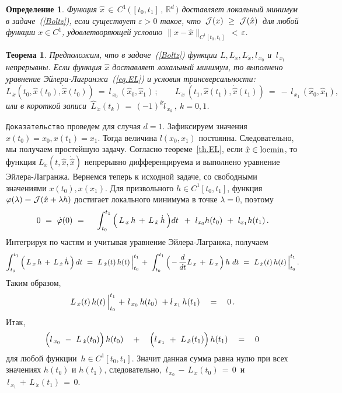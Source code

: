 \documentclass[12pt,a4paper]{article}
\newtheorem{theorem}{Теорема}
\newtheorem{defi}{Определение}
\newcommand{\re}{{\mathbb R}}
\newcommand{\cJ}{{\cal{J}}}
\begin{document}
\begin{defi}\label{d.feasible-boltz}
Функция $\hat x \, \in \, C^1\, \bigl( \, [t_0, t_1]\, , \, \re^d
\, \bigr)$ доставляет локальный минимум в
задаче~(\ref{Boltz}), если существует $\varepsilon
> 0$ такое, что $\, \cJ (x)\ \ge \ \cJ(\hat x)\, $ для любой
 функции $x \in C^1$, удовлетворяющей условию $\bigl\| x- \hat x
\bigr\|_{C^1[t_0, t_1]}\, < \, \varepsilon$.
\end{defi}
\begin{theorem}\label{th.Boltz}
Предположим, что в задаче~(\ref{Boltz}) функции $L, L_x, L_{\dot
x}, l_{\, x_0}$ и $\, l_{\, x_1}\, $ непрерывны.  Если функция
$\hat x$ доставляет локальный минимум, то выполнено
уравнение Эйлера-Лагранжа~(\ref{eq.EL}) и условия
трансверсальности:
\begin{equation}\label{eq.trans}
 L_{\, \dot x}(t_0, \hat x (t_0), \dot {\hat x}(t_0)) \ = \  l_{\, x_0}\, (\hat x_0, \hat x_1)\, ;
\qquad  L_{\, \dot x}\, (t_1, \hat x (t_1), \dot {\hat x}(t_1)) \
= \ -\, l_{\, x_1}\, (\hat x_0, \hat x_1),
\end{equation}
или в короткой записи $\, \hat L_{\, \dot x}(t_k)\, = \, (-1)^k
\hat l_{\, x_k}\, , \ k = 0,1$.
\end{theorem}
{\tt Доказательство} проведем для случая $d=1$.
Зафиксируем значения $x(t_0) = x_0, x(t_1) = x_1$. Тогда
величина $l(x_0, x_1)$ постоянна. Следовательно, мы получаем простейшую задачу.
Согласно теореме~\ref{th.EL}, если $\hat x \in {\rm locmin}$, то
функция $L_{\dot x}(t, \hat x, \dot {\hat x})$ непрерывно дифференцируема и
выполнено уравнение Эйлера-Лагранжа. Вернемся теперь к исходной задаче,
со свободными значениями $x(t_0), x(x_1)$. Для призвольного $h \in C^1[t_0, t_1]$, функция
$\varphi(\lambda) = \cJ(\hat x +
 \lambda h)$ достигает локального минимума в точке $\lambda = 0$, поэтому
 $$
0 \ = \ \dot \varphi(0)\ = \ \quad \int_{t_0}^{t_1}\, \Bigl(\, L_{\, x} \, h \, + \, L_{\, \dot
x}\, \dot h\, \Bigr)d t\, \ + \ l_{x_0}h(t_0) \ + \ l_{x_1}h(t_1)\, .
 $$
 Интегрируя по частям и учитывая уравнение Эйлера-Лагранжа,
получаем
$$
\int_{t_0}^{t_1}\, \Bigl(\, L_{\, x} \, h \, + \,
 L_{\, \dot x}\, \dot h\, \Bigr)\, d t\ =  \
  L_{\, \dot x}(t)\,  h(t)\, \Bigl|_{t_0}^{t_1} \ + \ \int_{t_0}^{t_1}\, \Bigl(\, - \, \frac{d}{dt} L_{\, x}  \, + \,
 L_{\, x}\, \Bigr)\, h\,\, d t \ = \ L_{\, \dot x}(t)\,  h(t)\, \Bigl|_{t_0}^{t_1}\, .
$$
 Таким образом, 
$$
 L_{\, \dot x}(t)\,  h(t)\, \Bigl|_{t_0}^{t_1}  \ + \
l_{\, x_0}\, h(t_0)\ +  l_{\, x_1}\, h(t_1) \quad = \quad 0\, .
$$
Итак,
$$
\Bigl(  l_{\, x_0} \ - \  L_{\, \dot x}(t_0)\Bigr)\,
h(t_0) \quad + \quad \Bigl( l_{\, x_1} \ + \  L_{\, \dot
x}(t_1)\Bigr)\, h(t_1)\quad = \quad 0\,
$$
для любой функции~$h \in C^1[t_0, t_1]$. Значит данная сумма равна
нулю при всех значениях $h(t_0)$ и $h(t_1)$, следовательно, $\,
 l_{\, x_0} \, - \,  L_{\, \dot x}(t_0)\, = \, 0\, $ и $\,
l_{\, x_1} \, + \, L_{\, \dot x}(t_1)\, = \, 0$.
\end{document}
